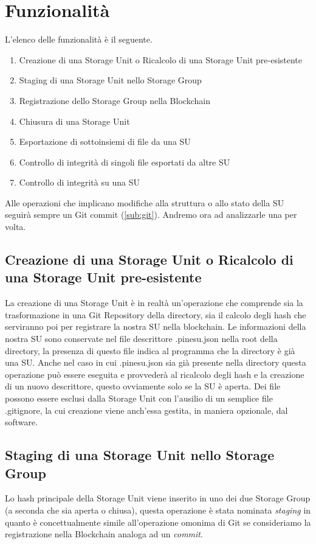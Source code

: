 \section{Funzionalità}

L’elenco delle funzionalità è il seguente.

\begin{enumerate}
    \item Creazione di una Storage Unit o Ricalcolo di una Storage Unit pre-esistente
    \item Staging di una Storage Unit nello Storage Group
    \item Registrazione dello Storage Group nella Blockchain
    \item Chiusura di una Storage Unit
    \item Esportazione di sottoinsiemi di file da una SU
    \item Controllo di integrità di singoli file esportati da altre SU
    \item Controllo di integrità su una SU
\end{enumerate}

Alle operazioni che implicano modifiche alla struttura o allo stato della SU seguirà sempre un Git \textsf{commit} (\autoref{sub:git}).
Andremo ora ad analizzarle una per volta.

\subsection{Creazione di una Storage Unit o Ricalcolo di una Storage Unit pre-esistente}
La creazione di una Storage Unit è in realtà un’operazione che comprende sia la trasformazione in una Git Repository della directory, sia il calcolo degli hash che serviranno poi per registrare la nostra SU nella blockchain. Le informazioni della nostra SU sono conservate nel file descrittore \textsf{.pinesu.json} nella root della directory, la presenza di questo file indica al programma che la directory è già una SU. Anche nel caso in cui .pinesu.json sia già presente nella directory questa operazione può essere eseguita e provvederà al ricalcolo degli hash e la creazione di un nuovo descrittore, questo ovviamente solo se la SU è aperta.
Dei file possono essere esclusi dalla Storage Unit con l’ausilio di un semplice file \textsf{.gitignore}, la cui creazione viene anch’essa gestita, in maniera opzionale, dal software.

\subsection{Staging di una Storage Unit nello Storage Group}
Lo hash principale della Storage Unit viene inserito in uno dei due Storage Group (a seconda che sia aperta o chiusa), questa operazione è stata nominata \emph{staging} in quanto è concettualmente simile all’operazione omonima di Git se consideriamo la registrazione nella Blockchain analoga ad un \emph{commit}.

